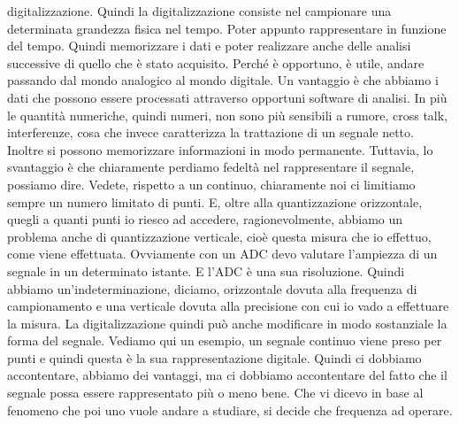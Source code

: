digitalizzazione. Quindi la digitalizzazione consiste nel campionare una determinata grandezza fisica nel tempo. Poter appunto rappresentare in funzione del tempo. Quindi memorizzare i dati e poter realizzare anche delle analisi successive di quello che è stato acquisito. Perché è opportuno, è utile, andare passando dal mondo analogico al mondo digitale. Un vantaggio è che abbiamo i dati che possono essere processati attraverso opportuni software di analisi. In più le quantità numeriche, quindi numeri, non sono più sensibili a rumore, cross talk, interferenze, cosa che invece caratterizza la trattazione di un segnale netto. Inoltre si possono memorizzare informazioni in modo permanente. Tuttavia, lo svantaggio è che chiaramente perdiamo fedeltà nel rappresentare il segnale, possiamo dire. Vedete, rispetto a un continuo, chiaramente noi ci limitiamo sempre un numero limitato di punti. E, oltre alla quantizzazione orizzontale, quegli a quanti punti io riesco ad accedere, ragionevolmente, abbiamo un problema anche di quantizzazione verticale, cioè questa misura che io effettuo, come viene effettuata. Ovviamente con un ADC devo valutare l'ampiezza di un segnale in un determinato istante. E l'ADC è una sua risoluzione. Quindi abbiamo un'indeterminazione, diciamo, orizzontale dovuta alla frequenza di campionamento e una verticale dovuta alla precisione con cui io vado a effettuare la misura. La digitalizzazione quindi può anche modificare in modo sostanziale la forma del segnale. Vediamo qui un esempio, un segnale continuo viene preso per punti e quindi questa è la sua rappresentazione digitale. Quindi ci dobbiamo accontentare, abbiamo dei vantaggi, ma ci dobbiamo accontentare del fatto che il segnale possa essere rappresentato più o meno bene. Che vi dicevo in base al fenomeno che poi uno vuole andare a studiare, si decide che frequenza ad operare. 

